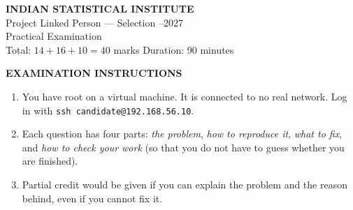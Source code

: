 \documentclass[11pt,a4paper]{article}
\begin{document}
\begin{center}
  {\large\textbf{INDIAN STATISTICAL INSTITUTE}}\\[0.6em]
  Project Linked Person --- Selection --2027\\[0.35em]
  Practical Examination\\[0.35em]
  Total: $14 + 16 + 10 = 40$ marks \qquad Duration: 90 minutes
\end{center}

\begin{framed}
\begin{center}\textbf{EXAMINATION INSTRUCTIONS}\end{center}
\begin{enumerate}[leftmargin=1.5em,itemsep=0.35em,topsep=0.3em]
  \item You have root on a virtual machine. It is connected to no real network. Log in with \verb|ssh candidate@192.168.56.10|.
  \item Each question has four parts: \emph{the problem}, \emph{how to
        reproduce it}, \emph{what to fix}, and \emph{how to check your work} (so that you do not have to guess whether you are
        finished).
  \item Partial credit would be given if you can explain the problem and the reason behind, even if you cannot fix it. 
\end{enumerate}
\end{framed}
\end{document}
